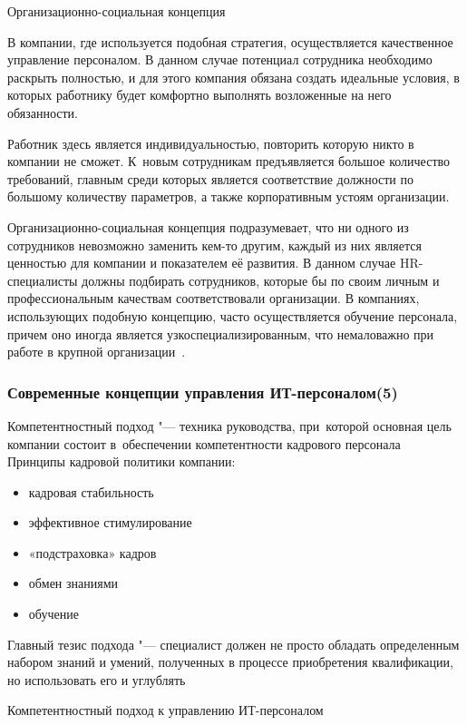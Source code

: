\documentclass{../industrial-development}
\begin{document}
	\lecturenotes
	
	\alert{Организационно-социальная концепция}
	
	В компании, где используется подобная стратегия, осуществляется качественное управление персоналом. В данном случае потенциал сотрудника необходимо раскрыть полностью, и для этого компания обязана создать идеальные условия, в которых работнику будет комфортно выполнять возложенные на него обязанности.
	
	Работник здесь является индивидуальностью, повторить которую никто в компании не сможет. К~новым сотрудникам предъявляется большое количество требований, главным среди которых является соответствие должности по большому количеству параметров, а также корпоративным устоям организации. 
	
	Организационно-социальная концепция подразумевает, что ни одного из сотрудников невозможно заменить кем-то другим, каждый из них является ценностью для компании и показателем её развития. В данном случае HR-специалисты должны подбирать сотрудников, которые бы по своим личным и профессиональным качествам соответствовали организации. В компаниях, использующих подобную концепцию, часто осуществляется обучение персонала, причем оно иногда является узкоспециализированным, что немаловажно при работе в крупной организации~\cite{Sovrconcept}. 
	
	\begin{frame} \frametitle{Современные концепции управления ИТ-персоналом(5)}
		\alert{Компетентностный подход} "---  техника руководства, при~которой основная цель компании состоит в~обеспечении компетентности кадрового персонала 
		\\Принципы кадровой политики компании: 
		\begin{itemize}
			\item кадровая стабильность
			\item эффективное стимулирование
			\item «подстраховка» кадров
			\item обмен знаниями
			\item обучение
		\end{itemize}
		Главный тезис подхода "--- специалист должен не просто обладать определенным набором знаний и умений, полученных в процессе приобретения квалификации, но использовать его и углублять 
	\end{frame}
	
	\lecturenotes
	
	\alert{Компетентностный подход к управлению ИТ-персоналом}
	
\end{document}
